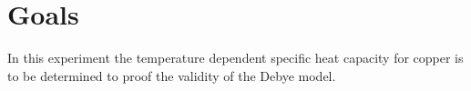 \chapter{Goals}
\label{cha:goals}
 
In this experiment the temperature dependent specific heat capacity for copper is to be determined to proof
the validity of the Debye model.